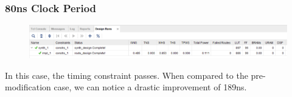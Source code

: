 \documentclass[11pt]{report}
\begin{document}
\subsubsection*{80ns Clock Period}
\begin{figure}[H]
    \includegraphics[width=\columnwidth]{Waveforms/taskc_80ns_design-runs.png}
\end{figure}
In this case, the timing constraint passes. When compared to the pre-modification case, we can notice a drastic improvement of 189ns.
\end{document}
